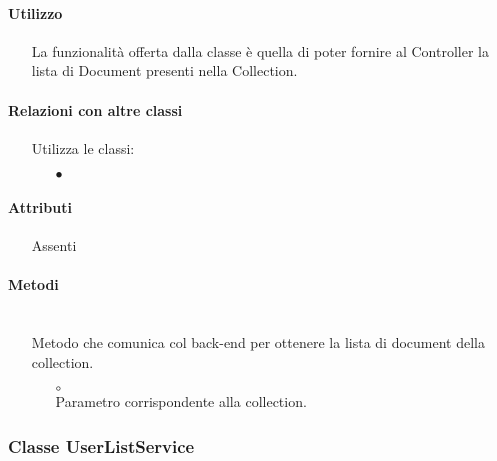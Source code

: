\paragraph*{Utilizzo}
\begin{itemize}
\item[] La  funzionalità offerta dalla classe è quella di poter fornire al Controller la lista di Document presenti nella Collection.
\end{itemize}

\paragraph*{Relazioni con altre classi}
\begin{itemize}


\item[] Utilizza le classi:
\begin{itemize}
\item[$\bullet$] 
\end{itemize}
\end{itemize}

\paragraph*{Attributi}
\begin{itemize}
\item[] Assenti
\end{itemize}

\paragraph*{Metodi}
\begin{itemize}
\item[]  \\ Metodo che comunica col back-end per ottenere la lista di document della collection.
\begin{itemize}\addtolength{\itemsep}{-0.5\baselineskip}
\item[$\circ$]  \\ Parametro corrispondente alla collection.
\end{itemize}
\end{itemize}

\subsubsection{Classe UserListService}

